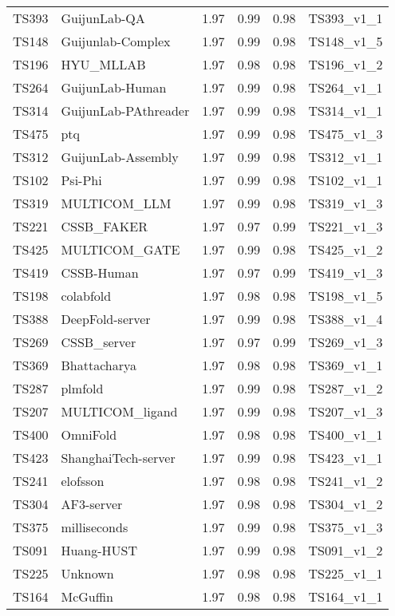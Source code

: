 \begin{longtable}{llllll}
TS393 & GuijunLab-QA & 1.97 & 0.99 & 0.98 & TS393\_v1\_1 \\ 
TS148 & Guijunlab-Complex & 1.97 & 0.99 & 0.98 & TS148\_v1\_5 \\ 
TS196 & HYU\_MLLAB & 1.97 & 0.98 & 0.98 & TS196\_v1\_2 \\ 
TS264 & GuijunLab-Human & 1.97 & 0.99 & 0.98 & TS264\_v1\_1 \\ 
TS314 & GuijunLab-PAthreader & 1.97 & 0.99 & 0.98 & TS314\_v1\_1 \\ 
TS475 & ptq & 1.97 & 0.99 & 0.98 & TS475\_v1\_3 \\ 
TS312 & GuijunLab-Assembly & 1.97 & 0.99 & 0.98 & TS312\_v1\_1 \\ 
TS102 & Psi-Phi & 1.97 & 0.99 & 0.98 & TS102\_v1\_1 \\ 
TS319 & MULTICOM\_LLM & 1.97 & 0.99 & 0.98 & TS319\_v1\_3 \\ 
TS221 & CSSB\_FAKER & 1.97 & 0.97 & 0.99 & TS221\_v1\_3 \\ 
TS425 & MULTICOM\_GATE & 1.97 & 0.99 & 0.98 & TS425\_v1\_2 \\ 
TS419 & CSSB-Human & 1.97 & 0.97 & 0.99 & TS419\_v1\_3 \\ 
TS198 & colabfold & 1.97 & 0.98 & 0.98 & TS198\_v1\_5 \\ 
TS388 & DeepFold-server & 1.97 & 0.99 & 0.98 & TS388\_v1\_4 \\ 
TS269 & CSSB\_server & 1.97 & 0.97 & 0.99 & TS269\_v1\_3 \\ 
TS369 & Bhattacharya & 1.97 & 0.98 & 0.98 & TS369\_v1\_1 \\ 
TS287 & plmfold & 1.97 & 0.99 & 0.98 & TS287\_v1\_2 \\ 
TS207 & MULTICOM\_ligand & 1.97 & 0.99 & 0.98 & TS207\_v1\_3 \\ 
TS400 & OmniFold & 1.97 & 0.98 & 0.98 & TS400\_v1\_1 \\ 
TS423 & ShanghaiTech-server & 1.97 & 0.99 & 0.98 & TS423\_v1\_1 \\ 
TS241 & elofsson & 1.97 & 0.98 & 0.98 & TS241\_v1\_2 \\ 
TS304 & AF3-server & 1.97 & 0.98 & 0.98 & TS304\_v1\_2 \\ 
TS375 & milliseconds & 1.97 & 0.99 & 0.98 & TS375\_v1\_3 \\ 
TS091 & Huang-HUST & 1.97 & 0.99 & 0.98 & TS091\_v1\_2 \\ 
TS225 & Unknown & 1.97 & 0.98 & 0.98 & TS225\_v1\_1 \\ 
TS164 & McGuffin & 1.97 & 0.98 & 0.98 & TS164\_v1\_1 \\ 

\end{longtable}
